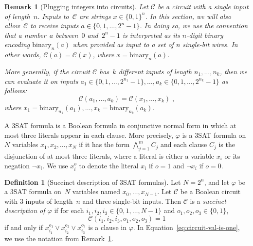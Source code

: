 \documentclass[11pt]{article}
\newtheorem{remark}[theorem]{Remark}
\theoremstyle{definition}
\newtheorem{definition}[theorem]{Definition}
\newcommand{\circuit}{\mathcal{C}}
\newcommand{\binary}[1]{\mathrm{binary}_{#1}}
\begin{document}
\begin{remark}[Plugging integers into circuits]\label{rem:plugging-in-integers}
  Let $\circuit$ be a circuit with a single input of length~$n$.
  Inputs to~$\circuit$ are strings $x \in \{0, 1\}^n$.
  In this section, we will also allow~$\circuit$ to receive inputs $a \in \{0,
  1, \ldots, 2^n-1\}$.
  In doing so, we use the convention that a number~$a$ between~$0$ and~$2^{n}-1$
  is interpreted as its $n$-digit binary encoding $\binary{n}(a)$
when provided as input to a set of
  $n$ single-bit wires.
  In other words, $\circuit(a) = \circuit(x)$, where $x = \binary{n}(a)$.

  More generally, if the circuit $\circuit$ has~$k$ different inputs of length
  $n_1, \ldots, n_k$, then we can evaluate it on inputs $a_1 \in \{0, 1, \ldots,
  2^{n_1}-1\}, \ldots, a_k \in \{0, 1, \ldots, 2^{n_k}-1\}$ as follows:
  \begin{equation*}
    \circuit(a_1, \ldots, a_k) = \circuit(x_1, \ldots, x_k)\;,
  \end{equation*}
  where $x_1 = \binary{n_1}(a_1), \ldots, x_k = \binary{n_k}(a_k)$.
\end{remark}

A 3SAT formula is a Boolean formula in conjunctive normal form in which at most
three literals appear in each clause.
More precisely, $\varphi$ is a 3SAT formula on $N$ variables $x_1, x_2, \ldots,
x_N$ if it has the form $\bigwedge_{j=1}^m C_j$ and each clause $C_j$ is the
disjunction of at most three literals, where a literal is either a variable
$x_i$ or its negation $\neg x_i$.
We use $x_i^o$ to denote the literal $x_i$ if $o = 1$ and $\neg x_i$ if $o = 0$.

\begin{definition}[Succinct description of 3SAT formulas]
  \label{def:succinct-formulas}
  Let $N = 2^n$, and let $\varphi$ be a 3SAT formula on~$N$ variables named
  $x_0, \ldots, x_{N-1}$.
  Let $\circuit$ be a Boolean circuit with 3 inputs of length~$n$ and three
  single-bit inputs.
  Then $\circuit$ is a \emph{succinct description of $\varphi$} if for each
  $i_1, i_2, i_3 \in \{0, 1, \ldots, N-1\}$ and $o_1, o_2, o_3 \in \{0, 1\}$,
  \begin{equation}\label{eq:circuit-val-is-one}
    \circuit(i_1, i_2, i_3, o_1, o_2, o_3) = 1
  \end{equation}
  if and only if $x_{i_1}^{o_1} \lor x_{i_2}^{o_2} \lor x_{i_3}^{o_3}$ is a
  clause in $\varphi$.
  In Equation~\eqref{eq:circuit-val-is-one}, we use the notation from
  Remark~\ref{rem:plugging-in-integers}.
\end{definition}
  
\end{document}
